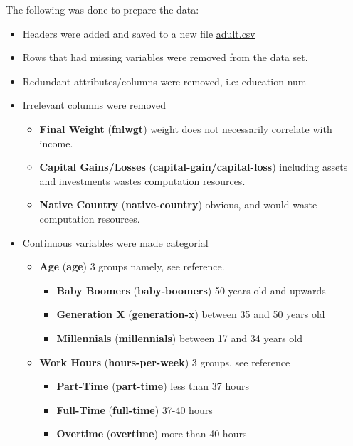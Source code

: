 \documentclass[12pt]{article}
\begin{document}
	The following was done to prepare the data:
	\begin{itemize}
		\item Headers were added and saved to a new file \href{run:../data/adult.csv}{adult.csv}
		\item Rows that had missing variables were removed from the data set.
		\item Redundant attributes/columns were removed, i.e: education-num
		\item Irrelevant columns were removed
		\begin{itemize}
			\item {\bfseries Final Weight} ({\bfseries fnlwgt}) weight does not necessarily correlate with income\cite{weight-and-income}.
			\item {\bfseries Capital Gains/Losses} ({\bfseries capital-gain/capital-loss}) including assets and investments wastes computation resources\cite{income-vs-capital}.
			\item {\bfseries Native Country} ({\bfseries native-country}) obvious, and would waste computation resources.
		\end{itemize}
		\item Continuous variables were made categorial
		\begin{itemize}
			\item {\bfseries Age} ({\bfseries age}) 3 groups namely, see reference\cite{age-groups}.
			\begin{itemize}
				\item {\bfseries Baby Boomers} ({\bfseries baby-boomers}) 50 years old and upwards
				\item {\bfseries Generation X} ({\bfseries generation-x}) between 35 and 50 years old
				\item {\bfseries Millennials} ({\bfseries millennials}) between 17 and 34 years old
			\end{itemize}
			\item {\bfseries Work Hours} ({\bfseries hours-per-week}) 3 groups, see reference\cite{work-hours}
			\begin{itemize}
				\item {\bfseries Part-Time} ({\bfseries part-time}) less than 37 hours
				\item {\bfseries Full-Time} ({\bfseries full-time}) 37-40 hours
				\item {\bfseries Overtime} ({\bfseries overtime}) more than 40 hours
			\end{itemize}
		\end{itemize}

\end{itemize}
\end{document}
